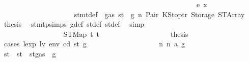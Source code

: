 \begin{isabellebody}
\ \ \ \ \ \ \ \ \ \ \ \ \ \ \ \ \ \ \isamarkupfalse%
\isanewline
\ \ \ \ \ \ \ \ \ \ \ \ \ \ \ \ \isamarkupfalse%
\isanewline
\ \ \ \ \ \ \ \ \ \ \ \ \ \ \ \ \ \ \isamarkupfalse%
\ {\isacharparenleft}{\kern0pt}e\ x{\isacharparenright}{\kern0pt}\isanewline
\ \ \ \ \ \ \ \ \ \ \ \ \ \ \ \ \ \ \isamarkupfalse%
\ {}{\isacharparenleft}{\kern0pt}{}{\isacharparenright}{\kern0pt}\ stmt{\isacharunderscore}{\kern0pt}def\ {\isacharbackquoteopen}{\isasymnot}\ gas\ st\ {\isasymle}\ g{\isacharbackquoteclose}\ n\ Pair\ KStoptr\ Storage\ STArray\ \isamarkupfalse%
\ {\isacharquery}{\kern0pt}thesis\ \isamarkupfalse%
\ stmt{\isachardot}{\kern0pt}psimps{\isacharparenleft}{\kern0pt}{}{\isacharparenright}{\kern0pt}\ g{\isacharunderscore}{\kern0pt}def\ st{\isacharprime}{\kern0pt}{\isacharunderscore}{\kern0pt}def\ st{\isacharprime}{\kern0pt}{\isacharprime}{\kern0pt}{\isacharunderscore}{\kern0pt}def\ \isamarkupfalse%
\ simp\isanewline
\ \ \ \ \ \ \ \ \ \ \ \ \ \ \ \ \isamarkupfalse%
\isanewline
\ \ \ \ \ \ \ \ \ \ \ \ \ \ \isamarkupfalse%
\isanewline
\ \ \ \ \ \ \ \ \ \ \ \ \ \ \ \ \isamarkupfalse%
\ {\isacharparenleft}{\kern0pt}STMap\ t\ t{\isacharprime}{\kern0pt}{\isacharparenright}{\kern0pt}\isanewline
\ \ \ \ \ \ \ \ \ \ \ \ \ \ \ \ \isamarkupfalse%
\ \isamarkupfalse%
\ {\isacharquery}{\kern0pt}thesis\isanewline
\ \ \ \ \ \ \ \ \ \ \ \ \ \ \ \ \isamarkupfalse%
\ {\isacharparenleft}{\kern0pt}cases\ {\isachardoublequoteopen}lexp\ lv\ env\ cd\ st{\isacharprime}{\kern0pt}{\isacharprime}{\kern0pt}\ g{\isacharprime}{\kern0pt}{\isachardoublequoteclose}{\isacharparenright}{\kern0pt}\isanewline
\ \ \ \ \ \ \ \ \ \ \ \ \ \ \ \ \ \ \isamarkupfalse%
\ n{}{\isacharcolon}{\kern0pt}\ {\isacharparenleft}{\kern0pt}n\ a\ g{\isacharprime}{\kern0pt}{\isacharprime}{\kern0pt}{\isacharparenright}{\kern0pt}\isanewline
\ \ \ \ \ \ \ \ \ \ \ \ \ \ \ \ \ \ \isamarkupfalse%
\ st{\isacharprime}{\kern0pt}{\isacharprime}{\kern0pt}{\isacharprime}{\kern0pt}\ \ {\isachardoublequoteopen}st{\isacharprime}{\kern0pt}{\isacharprime}{\kern0pt}{\isacharprime}{\kern0pt}\ {\isacharequal}{\kern0pt}\ st{\isacharprime}{\kern0pt}{\isacharprime}{\kern0pt}{\isasymlparr}gas\ {\isacharcolon}{\kern0pt}{\isacharequal}{\kern0pt}\ g{\isacharprime}{\kern0pt}{\isacharprime}{\kern0pt}{\isasymrparr}{\isachardoublequoteclose}\isanewline

\end{isabellebody}
